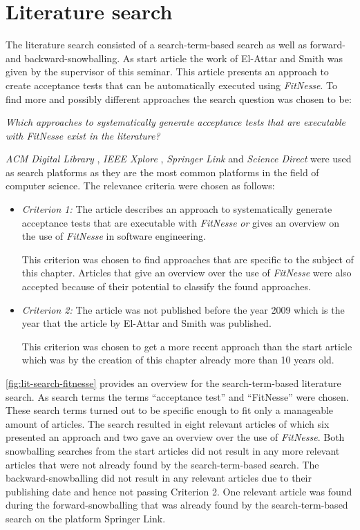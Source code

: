 \section{Literature search}
\label{sec:literature-search}

The literature search consisted of a search-term-based search as well as forward- and backward-snowballing.
As start article the work of El-Attar and Smith \cite{el-attar} was given by the supervisor of this seminar.
This article presents an approach to create acceptance tests that can be automatically executed using \textit{FitNesse}.
To find more and possibly different approaches the search question was chosen to be:

\begin{center}
\textit{
 Which approaches to systematically generate acceptance tests that are executable with \textit{FitNesse} exist in the literature?
}
\end{center}

\textit{ACM Digital Library} \cite{acm}, \textit{IEEE Xplore} \cite{ieee}, \textit{Springer Link} \cite{springer} and \textit{Science Direct} \cite{elsevier} were used as search platforms as they are the most common platforms in the field of computer science.
The relevance criteria were chosen as follows:
\begin{itemize}
	\item \textit{Criterion 1:} The article describes an approach to systematically generate acceptance tests that are executable with \textit{FitNesse} \textit{or} gives an overview on the use of \textit{FitNesse} in software engineering.
	
	This criterion was chosen to find approaches that are specific to the subject of this chapter.
	Articles that give an overview over the use of \textit{FitNesse} were also accepted because of their potential to classify the found approaches.
	
	\item \textit{Criterion 2:} The article was not published before the year 2009 which is the year that the article by El-Attar and Smith was published.
	
	This criterion was chosen to get a more recent approach than the start article which was by the creation of this chapter already more than 10 years old.
\end{itemize}

\autoref{fig:lit-search-fitnesse} provides an overview for the search-term-based literature search.
As search terms the terms \enquote{acceptance test} and \enquote{FitNesse} were chosen.
These search terms turned out to be specific enough to fit only a manageable amount of articles.
The search resulted in eight relevant articles of which six presented an approach and two gave an overview over the use of \textit{FitNesse}.
Both snowballing searches from the start articles did not result in any more relevant articles that were not already found by the search-term-based search.
The backward-snowballing did not result in any relevant articles due to their publishing date and hence not passing Criterion 2.
One relevant article was found during the forward-snowballing that was already found by the search-term-based search on the platform Springer Link.

